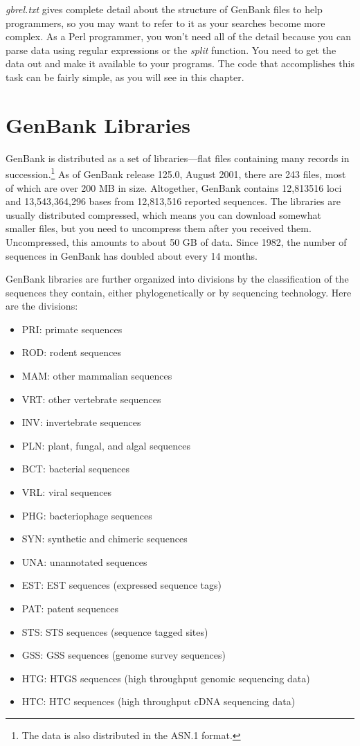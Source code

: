 \textit{gbrel.txt} gives complete detail about the structure of GenBank files to help programmers, so you may want to refer to it as your searches become more complex. As a Perl programmer, you won't need all of the detail because you can parse data using regular expressions or the \textit{split} function. You need to get the data out and make it available to your programs. The code that accomplishes this task can be fairly simple, as you will see in this chapter. 

\section{GenBank Libraries}
GenBank is distributed as a set of libraries—flat files containing many records in succession.\footnote{The data is also distributed in the ASN.1 format.} As of GenBank release 125.0, August 2001, there are 243 files, most of which are over 200 MB in size. Altogether, GenBank contains 12,813516 loci and 13,543,364,296 bases from 12,813,516 reported sequences. The libraries are usually distributed compressed, which means you can download somewhat smaller files, but you need to uncompress them after you received them. Uncompressed, this amounts to about 50 GB of data. Since 1982, the number of sequences in GenBank has doubled about every 14 months.

GenBank libraries are further organized into divisions by the classification of the sequences they contain, either phylogenetically or by sequencing technology. Here are the divisions: 

\begin{itemize}
  \item PRI: primate sequences
  \item ROD: rodent sequences
  \item MAM: other mammalian sequences
  \item VRT: other vertebrate sequences
  \item INV: invertebrate sequences
  \item PLN: plant, fungal, and algal sequences
  \item BCT: bacterial sequences
  \item VRL: viral sequences
  \item PHG: bacteriophage sequences
  \item SYN: synthetic and chimeric sequences
  \item UNA: unannotated sequences
  \item EST: EST sequences (expressed sequence tags)
  \item PAT: patent sequences
  \item STS: STS sequences (sequence tagged sites)
  \item GSS: GSS sequences (genome survey sequences)
  \item HTG: HTGS sequences (high throughput genomic sequencing data)
  \item HTC: HTC sequences (high throughput cDNA sequencing data)
\end{itemize}

